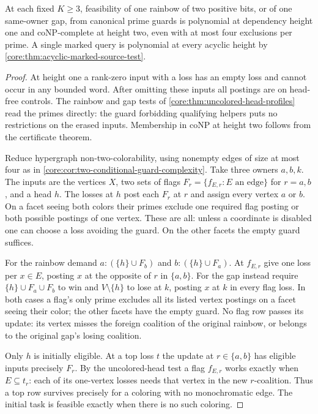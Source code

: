 \begin{corollary}
\label{core:cor:two-level-compact-profiles}
At each fixed $K\ge3$, feasibility of one rainbow of two positive
bits, or of one same-owner gap, from canonical prime guards is
polynomial at dependency height one and coNP-complete at height two,
even with at most four exclusions per prime. A single marked query is
polynomial at every acyclic height by \cref{core:thm:acyclic-marked-source-test}.
\end{corollary}
\begin{proof}
At height one a rank-zero input with a loss has an empty loss and
cannot occur in any bounded word. After omitting these inputs all
postings are on head-free controls. The rainbow and gap tests of
\cref{core:thm:uncolored-head-profiles} read the primes directly:
the guard forbidding qualifying helpers puts no restrictions on
the erased inputs. Membership in coNP at height two follows from
the certificate theorem.

Reduce hypergraph non-two-colorability, using nonempty edges of size
at most four as in \cref{core:cor:two-conditional-guard-complexity}.
Take three owners $a,b,k$. The inputs are the vertices $X$, two sets
of flags $F_r=\{f_{E,r}:E\text{ an edge}\}$ for $r=a,b$, and a head $h$.
The losses at $h$ post each $F_r$ at $r$ and assign every vertex $a$
or $b$. On a facet seeing both colors their primes exclude one required
flag posting or both possible postings of one vertex. These are all:
unless a coordinate is disabled one can choose a loss avoiding the
guard. On the other facets the empty guard suffices.

For the rainbow demand $a:(\{h\}\cup F_b)$ and $b:(\{h\}\cup F_a)$.
At $f_{E,r}$ give one loss per $x\in E$, posting $x$ at the opposite
of $r$ in $\{a,b\}$. For the gap instead require $\{h\}\cup F_a\cup F_b$
to win and $V\setminus\{h\}$ to lose at $k$, posting $x$ at $k$ in
every flag loss. In both cases a flag's only prime excludes all its
listed vertex postings on a facet seeing their color; the other
facets have the empty guard. No flag row passes its update: its
vertex misses the foreign coalition of the original rainbow, or
belongs to the original gap's losing coalition.

Only $h$ is initially eligible. At a top loss $t$ the update at
$r\in\{a,b\}$ has eligible inputs precisely $F_r$. By the uncolored-head
test a flag $f_{E,r}$ works exactly when $E\subseteq t_r$: each of
its one-vertex losses needs that vertex in the new $r$-coalition.
Thus a top row survives precisely for a coloring with no monochromatic
edge. The initial task is feasible exactly when there is no such coloring.
\end{proof}

